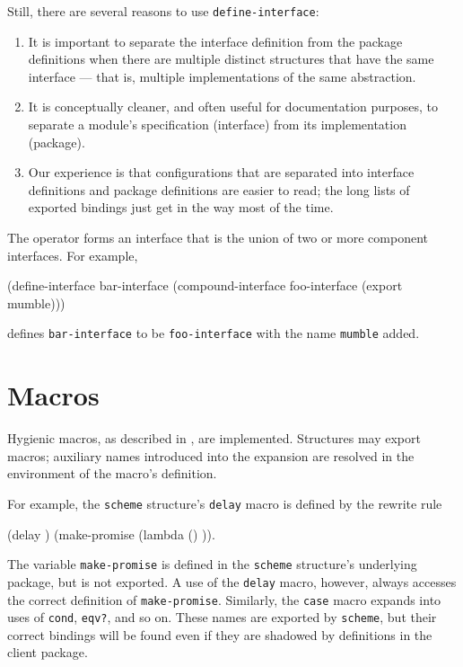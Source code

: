 Still, there are several reasons to use {\tt define-interface}:
\begin{enumerate}
\item It is important to separate the interface definition from the
package definitions when there are multiple distinct structures that
have the same interface --- that is, multiple implementations of the
same abstraction.

\item It is conceptually cleaner, and often useful for documentation
purposes, to separate a module's specification (interface) from its
implementation (package).

\item Our experience is that configurations that are separated into
interface definitions and package definitions are easier to read; the
long lists of exported bindings just get in the way most of the time.
\end{enumerate}

The  operator forms an interface that is the
union of two or more component interfaces.  For example,
\begin{example}
(define-interface bar-interface
  (compound-interface foo-interface (export mumble)))
\end{example}
defines {\tt bar-interface} to be {\tt foo-interface} with the name
{\tt mumble} ad\-ded.


\section{Macros}

Hygienic macros, as described in
\cite{Clinger-Rees:Macros,Clinger-Rees:R4RS}, are implemented.
Structures may export macros; auxiliary names introduced into the
expansion are resolved in the environment of the macro's definition.

For example, the {\tt scheme} structure's {\tt delay} macro 
is defined by the rewrite rule
\begin{example}
(delay )  \xform  (make-promise (lambda () )).
\end{example}
The variable {\tt make-promise} is defined in the {\tt scheme}
structure's underlying package, but is not exported.  A use of the
{\tt delay} macro, however, always accesses the correct definition
of {\tt make-promise}.  Similarly, the {\tt case} macro expands into
uses of {\tt cond}, {\tt eqv?}, and so on.  These names are exported
by {\tt scheme}, but their correct bindings will be found even if they
are shadowed by definitions in the client package.


